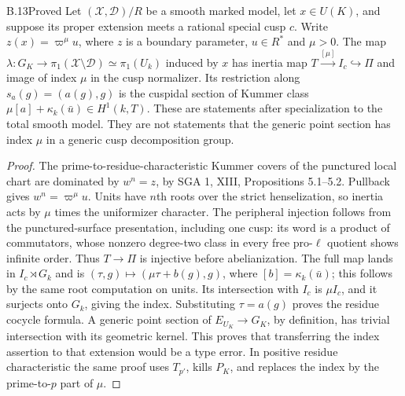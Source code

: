 \begin{claim}{B.13}{Proved}
Let $(\mathcal X,\mathcal D)/R$ be a smooth marked model, let $x\in U(K)$,
and suppose its proper extension meets a rational special cusp $c$.
Write $z(x)=\varpi^\mu u$, where $z$ is a boundary parameter, $u\in R^*$
and $\mu>0$. The map
$\lambda:G_K\to\pi_1(\mathcal X\setminus\mathcal D)
\simeq\pi_1(U_k)$ induced by $x$ has inertia map
$T\xrightarrow{[\mu]}I_c\hookrightarrow\Pi$ and image of index $\mu$
in the cusp normalizer. Its restriction along $s_a(g)=(a(g),g)$ is the
cuspidal section of Kummer class
$\mu[a]+\kappa_k(\bar u)\in H^1(k,T)$.
These are statements after specialization to the total smooth model.
They are not statements that the generic point section has index $\mu$
in a generic cusp decomposition group.
\end{claim}
\begin{proof}
The prime-to-residue-characteristic Kummer covers of the punctured local
chart are dominated by $w^n=z$, by SGA 1, XIII, Propositions 5.1--5.2.
Pullback gives $w^n=\varpi^\mu u$. Units have $n$th roots over the strict
henselization, so inertia acts by $\mu$ times the uniformizer character.
The peripheral injection follows from the punctured-surface presentation,
including one cusp: its word is a product of commutators, whose nonzero
degree-two class in every free pro-$\ell$ quotient shows infinite order.
Thus $T\to\Pi$ is injective before abelianization.
The full map lands in $I_c\rtimes G_k$ and is
$(\tau,g)\mapsto(\mu\tau+b(g),g)$, where $[b]=\kappa_k(\bar u)$;
this follows by the same root computation on units. Its intersection with
$I_c$ is $\mu I_c$, and it surjects onto $G_k$, giving the index. Substituting
$\tau=a(g)$ proves the residue cocycle formula. A generic point section of
$E_{U_K}\to G_K$, by definition, has trivial intersection with its geometric
kernel. This proves that transferring the index assertion to that extension
would be a type error. In positive residue characteristic the same proof
uses $T_{p'}$, kills $P_K$, and replaces the index by the prime-to-$p$ part
of $\mu$.
\end{proof}

